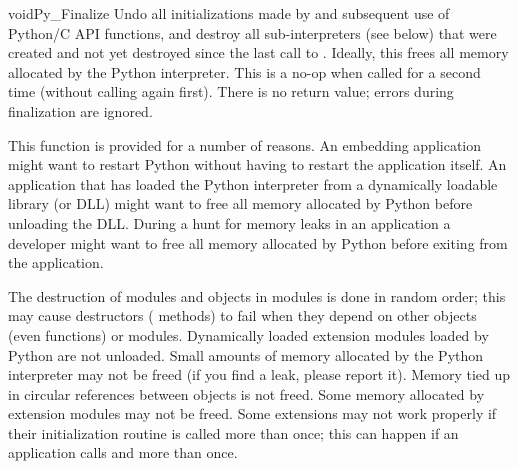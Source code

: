 \begin{cfuncdesc}{void}{Py_Finalize}{}
  Undo all initializations made by  and
  subsequent use of Python/C API functions, and destroy all
  sub-interpreters (see  below) that
  were created and not yet destroyed since the last call to
  .  Ideally, this frees all memory
  allocated by the Python interpreter.  This is a no-op when called
  for a second time (without calling  again
  first).  There is no return value; errors during finalization are
  ignored.

  This function is provided for a number of reasons.  An embedding
  application might want to restart Python without having to restart
  the application itself.  An application that has loaded the Python
  interpreter from a dynamically loadable library (or DLL) might want
  to free all memory allocated by Python before unloading the
  DLL. During a hunt for memory leaks in an application a developer
  might want to free all memory allocated by Python before exiting
  from the application.

   The destruction of modules and objects in
  modules is done in random order; this may cause destructors
  ( methods) to fail when they depend on other
  objects (even functions) or modules.  Dynamically loaded extension
  modules loaded by Python are not unloaded.  Small amounts of memory
  allocated by the Python interpreter may not be freed (if you find a
  leak, please report it).  Memory tied up in circular references
  between objects is not freed.  Some memory allocated by extension
  modules may not be freed.  Some extensions may not work properly if
  their initialization routine is called more than once; this can
  happen if an application calls  and
   more than once.
\end{cfuncdesc}

